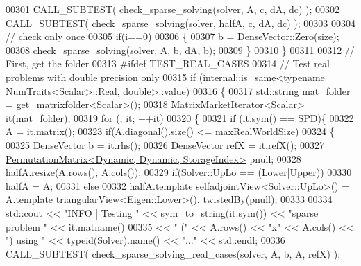 \begin{DoxyCode}
00301     CALL\_SUBTEST( check\_sparse\_solving(solver, A,     c,  dA, dc) );
00302     CALL\_SUBTEST( check\_sparse\_solving(solver, halfA, c,  dA, dc) );
00303     
00304     \textcolor{comment}{// check only once}
00305     \textcolor{keywordflow}{if}(i==0)
00306     \{
00307       b = DenseVector::Zero(size);
00308       check\_sparse\_solving(solver, A, b, dA, b);
00309     \}
00310   \}
00311   
00312   \textcolor{comment}{// First, get the folder }
00313 \textcolor{preprocessor}{#ifdef TEST\_REAL\_CASES}
00314   \textcolor{comment}{// Test real problems with double precision only}
00315   \textcolor{keywordflow}{if} (internal::is\_same<\textcolor{keyword}{typename} \hyperlink{group___core___module_struct_eigen_1_1_num_traits}{NumTraits<Scalar>::Real}, \textcolor{keywordtype}{double}>::value)
00316   \{
00317     std::string mat\_folder = get\_matrixfolder<Scalar>();
00318     \hyperlink{class_eigen_1_1_matrix_market_iterator}{MatrixMarketIterator<Scalar>} it(mat\_folder);
00319     \textcolor{keywordflow}{for} (; it; ++it)
00320     \{
00321       \textcolor{keywordflow}{if} (it.sym() == SPD)\{
00322         A = it.matrix();
00323         \textcolor{keywordflow}{if}(A.diagonal().size() <= maxRealWorldSize)
00324         \{
00325           DenseVector b = it.rhs();
00326           DenseVector refX = it.refX();
00327           \hyperlink{group___core___module}{PermutationMatrix<Dynamic, Dynamic, StorageIndex>}
       pnull;
00328           halfA.\hyperlink{class_eigen_1_1_plain_object_base_a99d9054ee2d5a40c6e00ded0265e9cea}{resize}(A.rows(), A.cols());
00329           \textcolor{keywordflow}{if}(Solver::UpLo == (\hyperlink{group__enums_gga39e3366ff5554d731e7dc8bb642f83cda891792b8ed394f7607ab16dd716f60e6}{Lower}|\hyperlink{group__enums_gga39e3366ff5554d731e7dc8bb642f83cda6bcb58be3b8b8ec84859ce0c5ac0aaec}{Upper}))
00330             halfA = A;
00331           \textcolor{keywordflow}{else}
00332             halfA.template selfadjointView<Solver::UpLo>() = A.template triangularView<Eigen::Lower>().
      twistedBy(pnull);
00333           
00334           std::cout << \textcolor{stringliteral}{"INFO | Testing "} << sym\_to\_string(it.sym()) << \textcolor{stringliteral}{"sparse problem "} << it.matname()
00335                   << \textcolor{stringliteral}{" ("} << A.rows() << \textcolor{stringliteral}{"x"} << A.cols() << \textcolor{stringliteral}{") using "} << \textcolor{keyword}{typeid}(Solver).name() << \textcolor{stringliteral}{"..."} <<
       std::endl;
00336           CALL\_SUBTEST( check\_sparse\_solving\_real\_cases(solver, A,     b, A, refX) );

\end{DoxyCode}
